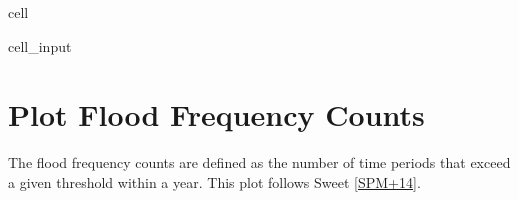 \documentclass[letterpaper,10pt,english]{jupyterBook}
\begin{document}
\begin{sphinxuseclass}{cell}\begin{sphinxVerbatimInput}

\begin{sphinxuseclass}{cell_input}
\begin{sphinxVerbatim}[commandchars=\\\{\}]
  
  
\end{sphinxVerbatim}

\end{sphinxuseclass}\end{sphinxVerbatimInput}

\end{sphinxuseclass}

\chapter{Plot Flood Frequency Counts}
\label{\detokenize{notebooks/FloodFrequency:plot-flood-frequency-counts}}
\sphinxAtStartPar
The flood frequency counts are defined as the number of time periods that exceed a given threshold within a year. This plot follows Sweet  {[}\hyperlink{cite.notebooks/FloodFrequency:id5}{SPM+14}{]}.
\end{document}

